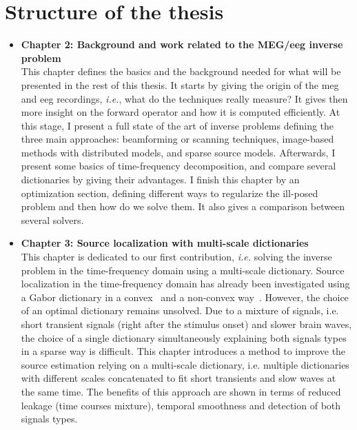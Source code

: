 \section{Structure of the thesis}
\begin{itemize}
\item \textbf{Chapter 2: Background and work related to the
MEG/\ac{eeg} inverse problem}\\
This chapter defines the basics and the background needed for what will be presented in the rest of this thesis. It starts by giving the origin of the \ac{meg} and \ac{eeg} recordings, \textit{i.e.}, what do the techniques really measure? It gives then more insight on the forward operator and how it is computed efficiently. At this stage, I present a full state of the art of inverse problems defining the three main approaches: beamforming or scanning techniques, image-based methods with distributed models, and sparse source models. Afterwards, I present some basics of time-frequency decomposition, and compare several dictionaries by giving their advantages. I finish this chapter by an optimization section, defining different ways to regularize the ill-posed problem and then how do we solve them. It also gives a comparison between several solvers.\\

\item \textbf{Chapter 3: Source localization with multi-scale dictionaries}\\
This chapter is dedicated to our first contribution, \textit{i.e.} solving the inverse problem in the time-frequency domain using a multi-scale dictionary. 
Source localization in the time-frequency domain has already been investigated using a Gabor dictionary in a convex~\cite{Gramfort_Strohmeier_Haueisen_Hamalainen_Kowalski13} and a non-convex way~\cite{Strohmeier-etal:2015}. However, the choice of an optimal dictionary remains unsolved. Due to a mixture of signals, i.e. short transient signals (right after the stimulus onset) and slower brain waves, the choice of a single dictionary simultaneously explaining both signals types in a sparse way is difficult. This chapter introduces a method to improve the source estimation relying on a multi-scale dictionary, i.e. multiple dictionaries with different scales concatenated to fit short transients and slow waves at the same time. The benefits of this approach are shown in terms of reduced leakage (time courses mixture), temporal smoothness and detection of both signals types.


\end{itemize}
